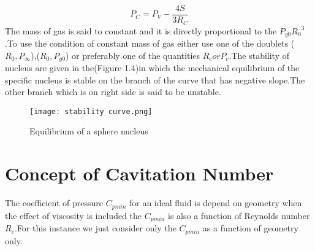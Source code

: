   \begin{equation}
  P_C = P_V -{\frac{4S}{3R_C}}
  \end{equation}
  The mass of gas is said to constant and it is directly proportional to the $P_{g0}{{R_0}^3}$.To use the condition of constant mass of gas either use one of the doublets
   ($R_0 ,P_{\infty}$),($R_0,P_{g0}$) or preferably one of the quantities $R_c or P_c $.The stability of nucleus are given in the(Figure 1.4)in which the mechanical equilibrium of the specific nucleus 
   is stable on the branch of the curve that has negative slope.The other branch which is on right side is said to be unstable.\\
   \begin{figure}[H]
    \centering
    \texttt{[image: stability curve.png]}
    \caption{Equilibrium of a sphere nucleus}
    \label{fig:fig4}
    \end{figure}
    \section{Concept of Cavitation Number}
    The coefficient of pressure $C_{pmin}$ for an ideal fluid is depend on geometry when the effect of viscosity is included the $C_{pmin}$ is also a function of Reynolds number $R_e$.For this instance we just
    consider only the $C_{pmin}$ as a function of geometry only.
    
